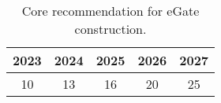 \begin{table}[ht]
\centering
\begin{tabular}{ccccc}
  \hline
{\textbf{2023}} & {\textbf{2024}} & {\textbf{2025}} & {\textbf{2026}} & {\textbf{2027}} \\ 
  \hline
 10 &  13 &  16 &  20 &  25 \\ 
   \hline
\end{tabular}
\caption{Core recommendation for eGate construction. \label{tab:core_recommendation}} 
\end{table}
